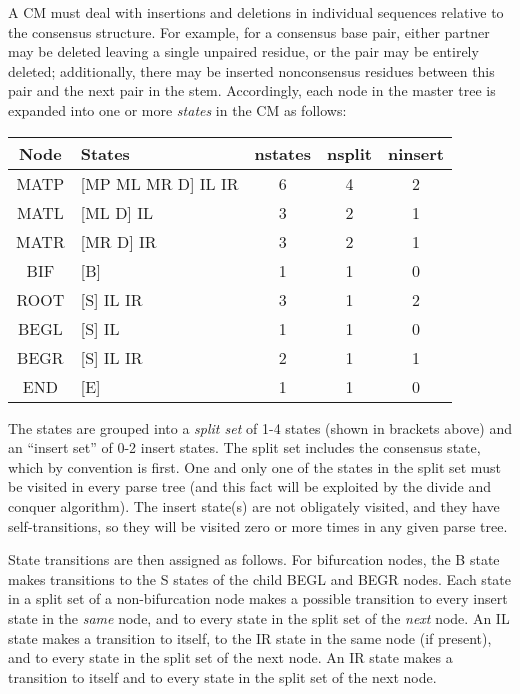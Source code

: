 \documentclass[11pt]{article}
\begin{document}
A CM must deal with insertions and deletions in individual sequences
relative to the consensus structure. For example, for a consensus base
pair, either partner may be deleted leaving a single unpaired residue,
or the pair may be entirely deleted; additionally, there may be
inserted nonconsensus residues between this pair and the next pair in
the stem. Accordingly, each node in the master tree is expanded into
one or more \emph{states} in the CM as follows:

\begin{tabular}{clccc}
Node   &  States             & nstates & nsplit & ninsert \\ \hline
MATP   & [MP ML MR D] IL IR  &   6     &   4    &  2   \\
MATL   & [ML D] IL           &   3     &   2    &  1   \\
MATR   & [MR D] IR           &   3     &   2    &  1   \\
BIF    & [B]                 &   1     &   1    &  0   \\
ROOT   & [S] IL IR           &   3     &   1    &  2   \\
BEGL   & [S] IL              &   1     &   1    &  0   \\
BEGR   & [S] IL IR           &   2     &   1    &  1   \\
END    & [E]                 &   1     &   1    &  0   \\ \hline
\end{tabular}

The states are grouped into a \emph{split set} of 1-4 states (shown in
brackets above) and an ``insert set'' of 0-2 insert states. The split
set includes the consensus state, which by convention is first. One
and only one of the states in the split set must be visited in every
parse tree (and this fact will be exploited by the divide and conquer
algorithm). The insert state(s) are not obligately visited, and they
have self-transitions, so they will be visited zero or more times in
any given parse tree.

State transitions are then assigned as follows. For bifurcation nodes,
the B state makes transitions to the S states of the child BEGL and
BEGR nodes. Each state in a split set of a non-bifurcation node makes
a possible transition to every insert state in the \emph{same} node,
and to every state in the split set of the \emph{next} node. An IL
state makes a transition to itself, to the IR state in the same node
(if present), and to every state in the split set of the next node. An
IR state makes a transition to itself and to every state in the split
set of the next node.
\end{document}
